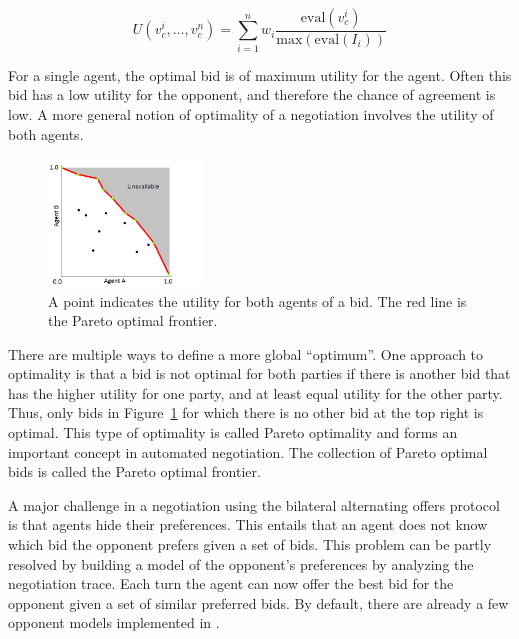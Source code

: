 \documentclass[]{article}
\begin{document}
\begin{equation}
	U(v^i_{c},\ldots,v^n_{c}) = \sum_{i=1}^{n} w_i \dfrac{\text{eval}(v^i_{c})}{\text{max}(\text{eval}(I_i))}
	\label{eqn:Utility}
\end{equation}

\pagebreak

For a single agent, the optimal bid is of maximum utility for the agent. Often this bid has a low utility for the opponent, and therefore the chance of agreement is low. A more general notion of optimality of a negotiation involves the utility of both agents.
\begin{figure}[htb]
	\centering
	\includegraphics[width=0.37\textwidth]{media/image5.png}
\caption{A point indicates the utility for both agents of a bid. The red line is the Pareto optimal frontier.}\label{Fig:utility plot}
\end{figure}

There are multiple ways to define a more global ``optimum''. One approach to optimality is that a bid is not optimal for both parties if there is another bid that has the higher utility for one party, and at least equal utility for the other party. Thus, only bids in Figure~\ref{Fig:utility plot} for which there is no other bid at the top right is optimal. This type of optimality is called Pareto optimality and forms an important concept in automated negotiation. The collection of Pareto optimal bids is called the Pareto optimal frontier.

A major challenge in a negotiation using the bilateral alternating offers protocol is that agents hide their preferences. This entails that an agent does not know which bid the opponent prefers given a set of bids. This problem can be partly resolved by building a model of the opponent's preferences by analyzing the negotiation trace. Each turn the agent can now offer the best bid for the opponent given a set of similar preferred bids. By default, there are already a few opponent models implemented in \Genius.
\end{document}

